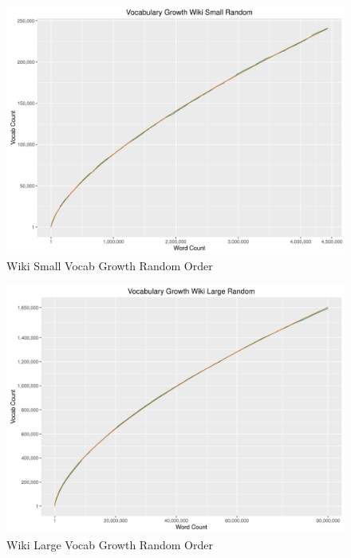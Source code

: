 \documentclass[11pt]{article}
\newenvironment{code}{\captionsetup{type=listing}}{}
\begin{document}
\begin{figure}[h]
\includegraphics[width=\columnwidth]{code/wikiSmallVR.png}
\caption{Wiki Small Vocab Growth Random Order}
\label{fig:wsvgr}
\end{figure}
\begin{figure}[h]
\includegraphics[width=\columnwidth]{code/wikiLargeVGR.png}
\caption{Wiki Large Vocab Growth Random Order}
\label{fig:wlvgr}
\end{figure}
\newpage
\clearpage
\begin{code}
	 \label{code:vcp}
\end{code}

\newpage
\begin{code}
	 \label{code:vcr}
\end{code}
\newpage
\end{document}
